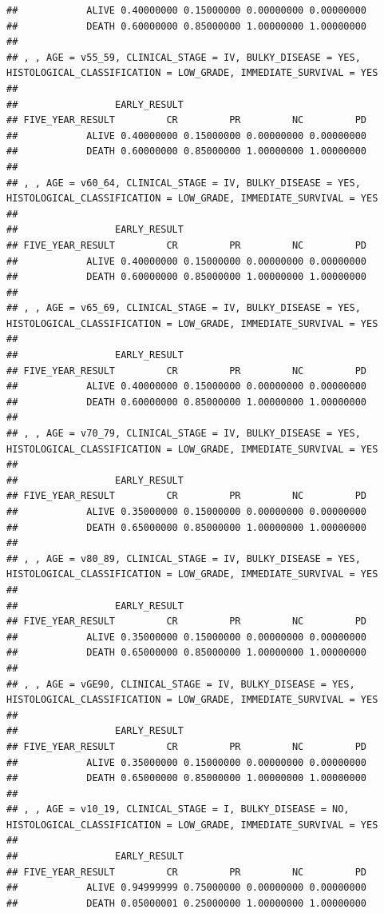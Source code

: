 \documentclass[]{article}
\begin{document}
\begin{verbatim}
##            ALIVE 0.40000000 0.15000000 0.00000000 0.00000000
##            DEATH 0.60000000 0.85000000 1.00000000 1.00000000
## 
## , , AGE = v55_59, CLINICAL_STAGE = IV, BULKY_DISEASE = YES, HISTOLOGICAL_CLASSIFICATION = LOW_GRADE, IMMEDIATE_SURVIVAL = YES
## 
##                 EARLY_RESULT
## FIVE_YEAR_RESULT         CR         PR         NC         PD
##            ALIVE 0.40000000 0.15000000 0.00000000 0.00000000
##            DEATH 0.60000000 0.85000000 1.00000000 1.00000000
## 
## , , AGE = v60_64, CLINICAL_STAGE = IV, BULKY_DISEASE = YES, HISTOLOGICAL_CLASSIFICATION = LOW_GRADE, IMMEDIATE_SURVIVAL = YES
## 
##                 EARLY_RESULT
## FIVE_YEAR_RESULT         CR         PR         NC         PD
##            ALIVE 0.40000000 0.15000000 0.00000000 0.00000000
##            DEATH 0.60000000 0.85000000 1.00000000 1.00000000
## 
## , , AGE = v65_69, CLINICAL_STAGE = IV, BULKY_DISEASE = YES, HISTOLOGICAL_CLASSIFICATION = LOW_GRADE, IMMEDIATE_SURVIVAL = YES
## 
##                 EARLY_RESULT
## FIVE_YEAR_RESULT         CR         PR         NC         PD
##            ALIVE 0.40000000 0.15000000 0.00000000 0.00000000
##            DEATH 0.60000000 0.85000000 1.00000000 1.00000000
## 
## , , AGE = v70_79, CLINICAL_STAGE = IV, BULKY_DISEASE = YES, HISTOLOGICAL_CLASSIFICATION = LOW_GRADE, IMMEDIATE_SURVIVAL = YES
## 
##                 EARLY_RESULT
## FIVE_YEAR_RESULT         CR         PR         NC         PD
##            ALIVE 0.35000000 0.15000000 0.00000000 0.00000000
##            DEATH 0.65000000 0.85000000 1.00000000 1.00000000
## 
## , , AGE = v80_89, CLINICAL_STAGE = IV, BULKY_DISEASE = YES, HISTOLOGICAL_CLASSIFICATION = LOW_GRADE, IMMEDIATE_SURVIVAL = YES
## 
##                 EARLY_RESULT
## FIVE_YEAR_RESULT         CR         PR         NC         PD
##            ALIVE 0.35000000 0.15000000 0.00000000 0.00000000
##            DEATH 0.65000000 0.85000000 1.00000000 1.00000000
## 
## , , AGE = vGE90, CLINICAL_STAGE = IV, BULKY_DISEASE = YES, HISTOLOGICAL_CLASSIFICATION = LOW_GRADE, IMMEDIATE_SURVIVAL = YES
## 
##                 EARLY_RESULT
## FIVE_YEAR_RESULT         CR         PR         NC         PD
##            ALIVE 0.35000000 0.15000000 0.00000000 0.00000000
##            DEATH 0.65000000 0.85000000 1.00000000 1.00000000
## 
## , , AGE = v10_19, CLINICAL_STAGE = I, BULKY_DISEASE = NO, HISTOLOGICAL_CLASSIFICATION = LOW_GRADE, IMMEDIATE_SURVIVAL = YES
## 
##                 EARLY_RESULT
## FIVE_YEAR_RESULT         CR         PR         NC         PD
##            ALIVE 0.94999999 0.75000000 0.00000000 0.00000000
##            DEATH 0.05000001 0.25000000 1.00000000 1.00000000

\end{verbatim}
\end{document}
